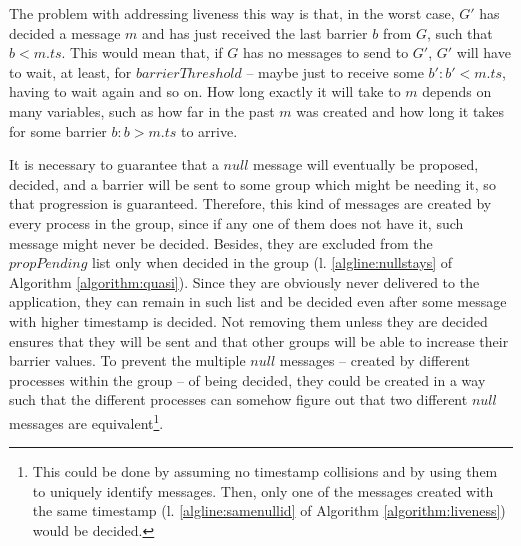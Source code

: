 \documentclass[times, 10pt]{article}
\begin{document}
The problem with addressing liveness this way is that, in the worst case, $G'$ has decided a message $m$ and has just received the last barrier $b$ from $G$, such that $b < m.ts$. This would mean that, if $G$ has no messages to send to $G'$, $G'$ will have to wait, at least, for $barrierThreshold$ -- maybe just to receive some $b' : b' < m.ts$, having to wait again and so on. How long exactly it will take to \cons{} $m$ depends on many variables, such as how far in the past $m$ was created and how long it takes for some barrier $b: b > m.ts$ to arrive.%

It is necessary to guarantee that a $null$ message will eventually be proposed, decided, and a barrier will be sent to some group which might be needing it, so that progression is guaranteed. Therefore, this kind of messages are created by every process in the group, since if any one of them does not have it, such message might never be decided. Besides, they are excluded from the $propPending$ list only when decided in the group (l. \ref{algline:nullstays} of Algorithm \ref{algorithm:quasi}). Since they are obviously never delivered to the application, they can remain in such list and be decided even after some message with higher timestamp is decided. Not removing them unless they are decided ensures that they will be sent and that other groups will be able to increase their barrier values. %
To prevent the multiple $null$ messages -- created by different processes within the group -- of being decided, they could be created in a way such that the different processes can somehow figure out that two different $null$ messages are equivalent\footnote{This could be done by assuming no timestamp collisions and by using them to uniquely identify messages. Then, only one of the messages created with the same timestamp (l. \ref{algline:samenullid} of Algorithm \ref{algorithm:liveness}) would be decided.}.
\end{document}
